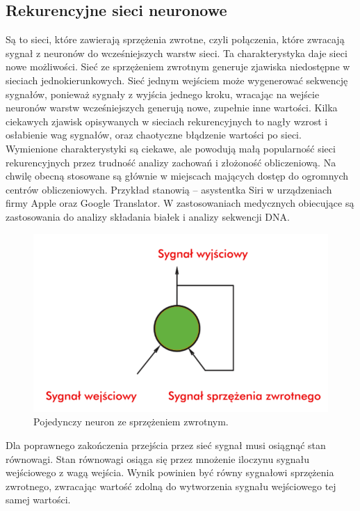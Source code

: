 \documentclass[12pt,a4paper,twoside,titlepage,openright]{book}
\begin{document}
\begin{itemize}
\begin{itemize}
\subsection{Rekurencyjne sieci neuronowe}
Są to sieci, które zawierają sprzężenia zwrotne, czyli połączenia, które zwracają sygnał z neuronów do wcześniejszych warstw sieci. Ta charakterystyka daje sieci nowe możliwości. Sieć ze sprzężeniem zwrotnym generuje zjawiska niedostępne w sieciach jednokierunkowych. Sieć jednym wejściem może wygenerować sekwencję sygnałów, ponieważ sygnały z wyjścia jednego kroku, wracając na wejście neuronów warstw wcześniejszych generują nowe, zupełnie inne wartości. Kilka ciekawych zjawisk opisywanych w sieciach rekurencyjnych to nagły wzrost i osłabienie wag sygnałów, oraz chaotyczne błądzenie wartości po sieci. Wymienione charakterystyki są ciekawe, ale powodują małą popularność sieci rekurencyjnych przez trudność analizy zachowań i złożoność obliczeniową. Na chwilę obecną stosowane są głównie w miejscach mających dostęp do ogromnych centrów obliczeniowych. Przykład stanowią -- asystentka Siri w urządzeniach firmy Apple oraz Google Translator. W zastosowaniach medycznych obiecujące są zastosowania do analizy składania białek i analizy sekwencji DNA.

\begin{figure}[ht]
	\centering
			\includegraphics[resolution=100, scale=0.5]{recurrentNeuralNetwork.png}
		\caption{Pojedynczy neuron ze sprzężeniem zwrotnym.}
\end{figure}

Dla poprawnego zakończenia przejścia przez sieć sygnał musi osiągnąć stan równowagi. Stan równowagi osiąga się przez mnożenie iloczynu sygnału wejściowego z wagą wejścia. Wynik powinien być równy sygnałowi sprzężenia zwrotnego, zwracając wartość zdolną do wytworzenia sygnału wejściowego tej samej wartości.


\end{itemize}
\end{itemize}
\end{document}
